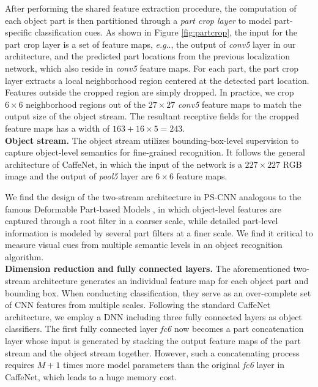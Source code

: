 \documentclass[10pt,twocolumn,letterpaper]{article}
\makeatletter
\DeclareRobustCommand\onedot{\futurelet\@let@token\@onedot}
\def\@onedot{\ifx\@let@token.\else.\null\fi\xspace}
\def\eg{\emph{e.g}\onedot} \def\Eg{\emph{E.g}\onedot}
\makeatother
\begin{document}
After performing the shared feature extraction procedure, the computation of each object part is then partitioned through a \emph{part crop layer} to model part-specific classification cues. As shown in Figure \ref{fig:partcrop}, the input for the part crop layer is a set of feature maps, \eg, the output of \textit{conv5} layer in our architecture, and the predicted part locations from the previous localization network, which also reside in \textit{conv5} feature maps. For each part, the part crop layer extracts a local neighborhood region centered at the detected part location. Features outside the cropped region are simply dropped. In practice, we crop $6\times 6$ neighborhood regions out of the $27\times 27$ \textit{conv5} feature maps to match the output size of the object stream. The resultant receptive fields for the cropped feature maps has a width of $163+16\times 5=243$.\\









\noindent\textbf{Object stream.}
The object stream utilizes bounding-box-level supervision to capture object-level semantics for fine-grained recognition. It follows the general architecture of CaffeNet, in which the input of the network is a $227\times 227$ RGB image and the output of \textit{pool5} layer are $6\times 6$ feature maps.



We find the design of the two-stream architecture in PS-CNN analogous to the famous Deformable Part-based Models \cite{felzenszwalb2010object}, in which object-level features are captured through a root filter in a coarser scale, while detailed part-level information is modeled by several part filters at a finer scale. We find it critical to measure visual cues from multiple semantic levels in an object recognition algorithm.\\


\noindent\textbf{Dimension reduction and fully connected layers.}
The aforementioned two-stream architecture generates an individual feature map for each object part and bounding box. When conducting classification, they serve as an over-complete set of CNN features from multiple scales. Following the standard CaffeNet architecture, we employ a DNN including three fully connected layers as object classifiers. The first fully connected layer \emph{fc6} now becomes a part concatenation layer whose input is generated by stacking the output feature maps of the part stream and the object stream together. However, such a concatenating process requires $M+1$ times more model parameters than the original \textit{fc6} layer in CaffeNet, which leads to a huge memory cost.
\end{document}
